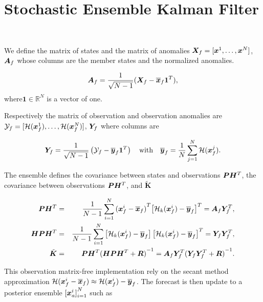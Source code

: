 
\appendix
\section{Stochastic Ensemble Kalman Filter}~\label{appendix:enkf}

We define the matrix of states and the matrix of anomalies $\bm{X}_f = [\bm{x}^1, \dots, \bm{x}^N]$, $\bm A_f$ whose columns are the member states and the normalized anomalies.

\begin{equation*}
    \bm A_f = \frac{1}{\sqrt{N - 1}}(\bm{X}_f - \overline{\bm{x}}_f \bm{1}^T),
\end{equation*}where$\bm{1} \in \mathbb{R}^N$ is a vector of one.

Respectively the matrix of observation and observation anomalies are $\mathcal Y_f = [\mathcal{H}(\bm{x}^1_f), \dots, \mathcal{H}(\bm{x}^N_f)]$, $\bm Y_f$ where columns are

\begin{equation*}
    \bm Y_f = \frac{1}{\sqrt{N - 1}} \left(\mathcal Y_f - \overline{\bm{y}}_f \bm{1}^T \right) \quad \text{with} \quad \overline{\bm{y}}_f = \frac{1}{N} \sum_{j=1}^{N} \mathcal{H}(\bm{x}^j_f).
\end{equation*}

The ensemble defines the covariance between states and observations $\bm{P} \bm H^T$, the covariance between observations $\bm{P} \bm H^T$, and $\tilde{\bm{K}}$

\begin{eqnarray*}
    \bm{P} \bm H^T &=& \frac{1}{N - 1} \sum_{i = 1}^{N} {(\bm{x}^i_f - \overline{\bm{x}}_f)}^T {\left[ \mathcal{H}_k(\bm{x}^i_f) - \overline{\bm{y}}_f\right]}^T = \bm A_f \bm Y_f^T, \\
    \bm H \bm{P} \bm H^T &=& \frac{1}{N -1} \sum_{i = 1}^{N}\left[ \mathcal{H}_k(\bm{x}^i_f) - \overline{\bm{y}}_f\right] {\left[ \mathcal{H}_k(\bm{x}^i_f) - \overline{\bm{y}}_f\right]}^T = \bm Y_f \bm Y_f^T,\\
    \tilde{\bm{K}} &=& \bm{P} \bm H^T{(\bm H \bm{P} \bm H^T + \bm R)}^{-1} = \bm A_f \bm Y_f^T {(\bm Y_f \bm Y_f^T + \bm R)}^{-1}.
\end{eqnarray*}

This observation matrix-free implementation rely on the secant method approximation $\mathcal{H}(\bm{x}^i_f - \overline{\bm{x}}_f) \approx \mathcal{H} (\bm{x}^i_f) - \overline{\bm{y}}_f$.
The forecast is then update to a posterior ensemble ${[\bm{x}^i_a]}_{i=1}^{N}$ such as

